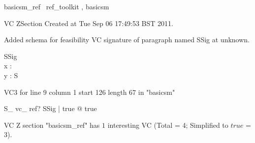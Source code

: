\documentclass{article}
\begin{document}

\begin{zsection}	 \SECTION basicsm\_ref \parents~ref\_toolkit , basicsm
\end{zsection}

VC ZSection Created at Tue Sep 06 17:49:53 BST 2011.


Added schema for feasibility VC signature of paragraph named SSig at unknown.
 \begin{schema}{SSig}\\
 x : \nat \\
 y : \nat 
\where
 S
\end{schema}

VC3 for line 9 column 1 start 126 length 67 in "basicsm"
\begin{theorem}{S\_ vc\_ ref}\vdash ? \exists SSig | true @ true
\end{theorem}



 VC Z section "basicsm_ref" has $1$ interesting VC (Total = 4; Simplified to $true$ = 3).



\end{document}
